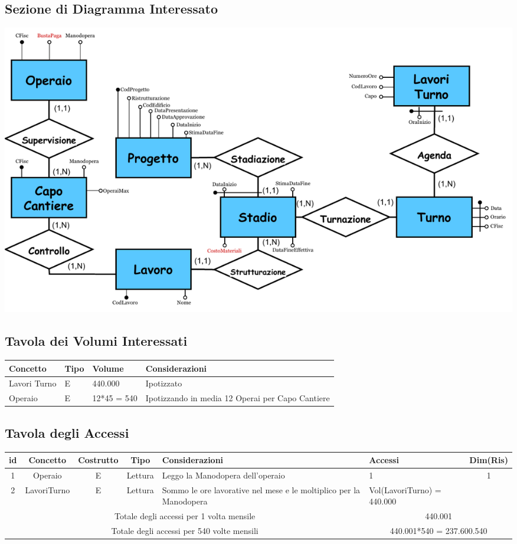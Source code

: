 \documentclass[12pt,a4paper]{report}
\begin{document}
            \subsection{Sezione di Diagramma Interessato}
            \begin{center}
                \includegraphics[scale=0.95]{sezione_operazione4.pdf}
            \end{center}
            
            \subsection{Tavola dei Volumi Interessati}
            \begin{tabular}{|p{4cm}|p{1cm}|p{3cm}|p{8cm}|}
                \hline
                \textbf{Concetto} & \textbf{Tipo} & \textbf{Volume} & \textbf{Considerazioni} \\ \hline
                Lavori Turno & E & 440.000 & Ipotizzato \\ \hline
                Operaio & E & 12*45 = 540 & Ipotizzando in media 12 Operai per Capo Cantiere \\ \hline
            \end{tabular}
            
            \subsection{Tavola degli Accessi}
            \begin{tabular}{|c|c|c|c|p{4cm}|p{3cm}|c|}
                \hline
                \textbf{id} & \textbf{Concetto} & \textbf{Costrutto} & \textbf{Tipo} & \textbf{Considerazioni} & \textbf{Accessi} & \textbf{Dim(Ris)} \\ \hline
                1 & Operaio & E & Lettura & Leggo la Manodopera dell'operaio & 1 & 1 \\ \hline
                2 & LavoriTurno & E & Lettura & Sommo le ore lavorative nel mese e le moltiplico per la Manodopera & Vol(LavoriTurno) = 440.000 & ~ \\ \hline
                \multicolumn{5}{|c|}{Totale degli accessi per 1 volta mensile} & \multicolumn{2}{|c|}{440.001} \\ \hline
                \multicolumn{5}{|c|}{Totale degli accessi per 540 volte mensili} & \multicolumn{2}{|c|}{440.001*540 = 237.600.540} \\ \hline
            \end{tabular}
\end{document}
